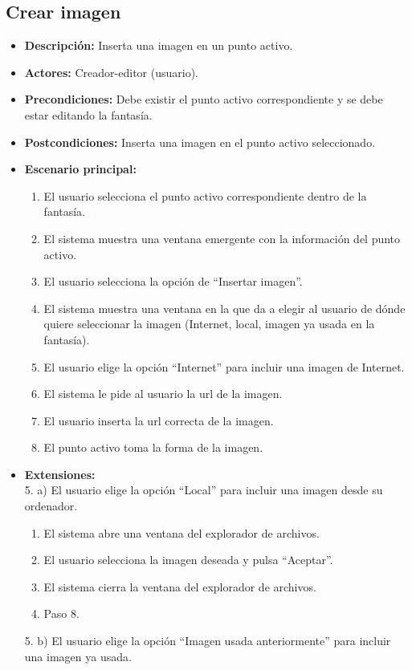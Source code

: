 \subsection{Crear imagen}
\begin{itemize}
	\item \textbf{Descripción:} Inserta una imagen en un punto activo.
	\item \textbf{Actores:} Creador-editor (usuario).
	\item \textbf{Precondiciones:} Debe existir el punto activo correspondiente y se debe estar editando la fantasía.
	\item \textbf{Postcondiciones:} Inserta una imagen en el punto activo seleccionado.
	\item \textbf{Escenario principal:}
	\begin{enumerate}
		\item El usuario selecciona el punto activo correspondiente dentro de la fantasía.
		\item El sistema muestra una ventana emergente con la información del punto activo.
		\item El usuario selecciona la opción de ``Insertar imagen''.
		\item El sistema muestra una ventana en la que da a elegir al usuario de dónde quiere seleccionar la imagen (Internet, local, imagen ya usada en la fantasía).
		\item El usuario elige la opción ``Internet'' para incluir una imagen de Internet.
		\item El sistema le pide al usuario la url de la imagen.
		\item El usuario inserta la url correcta de la imagen.
		\item El punto activo toma la forma de la imagen.
	\end{enumerate}
	\item \textbf{Extensiones:} \\5. a) El usuario elige la opción ``Local'' para incluir una imagen desde su ordenador.
	\begin{enumerate}
		\item El sistema abre una ventana del explorador de archivos.
		\item El usuario selecciona la imagen deseada y pulsa ``Aceptar''.
		\item El sistema cierra la ventana del explorador de archivos.
		\item Paso 8.
	\end{enumerate}
	5. b) El usuario elige la opción ``Imagen usada anteriormente'' para incluir una imagen ya usada.

\end{itemize}
